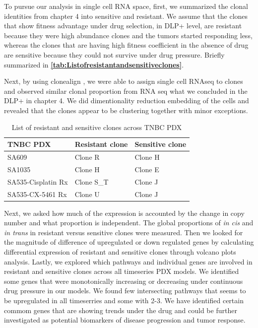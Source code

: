 To pursue our analysis in single cell RNA space, first, we summarized the clonal identities from chapter 4 into sensitive and resistant. We assume that the clones that show fitness advantage under drug selection, in DLP+ level, are resistant because they were high abundance clones and the tumors started responding less, whereas the clones that are having high fitness coefficient in the absence of drug are sensitive because they could not survive under drug pressure. Briefly summarized in  \textbf{\autoref{tab:Listofresistantandsensitiveclones}}.
 
Next, by using clonealign \cite{campbell2019clonealign}, we were able to assign single cell RNAseq to clones and observed similar clonal proportion from RNA seq what we concluded in the DLP+ in chapter 4. 
We did dimentionality reduction embedding of the cells and revealed that the clones appear to be clustering together with minor exceptions. 

   
 \begin{table}[htbp]
   
   \centering
   \caption{List of resistant and sensitive clones across TNBC PDX}
     \begin{tabular}{|l|l|l|}
      \hline
     TNBC PDX & Resistant clone & Sensitive clone \\
     \hline
     SA609  & Clone R & Clone H \\
     SA1035 & Clone H & Clone E \\
     SA535-Cisplatin Rx & Clone S\_T & Clone J \\
     SA535-CX-5461 Rx & Clone U & Clone J \\    \hline
     \end{tabular}%
   \label{tab:Listofresistantandsensitiveclones}%
   
  
 \end{table}%

Next, we asked how much of the expression is accounted by the change in copy number and what proportion is independent. The global proportions of \textit{in cis} and \textit{in trans} in resistant versus sensitive clones were measured. Then we looked for the magnitude of difference of upregulated or down regulated genes by calculating differential expression of resistant and sensitive clones through volcano plots analysis. Lastly, we explored which pathways and individual genes are involved in resistant and sensitive clones across all timeseries PDX models. We identified some genes that were monotonically increasing or decreasing under continuous drug pressure in our models. We found few intersecting pathways that seems to be upregulated in all timeserries and some with 2-3. We have identified certain commom genes that are showing trends under the drug and could be further investigated as potential biomarkers of disease progression and tumor response.


